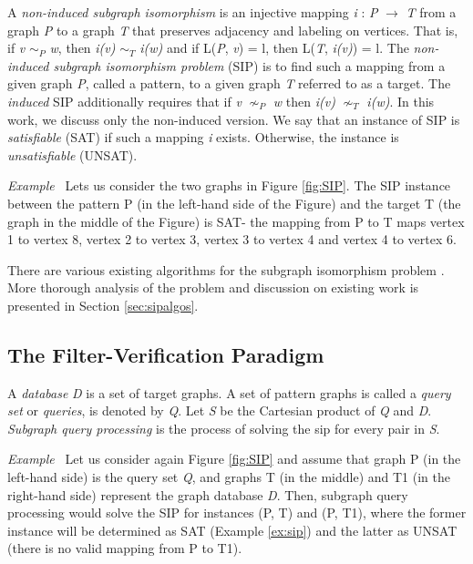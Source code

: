 \documentclass{l4proj}
\newcounter{example}[section]
\newenvironment{example}[1][]{\refstepcounter{example}\par\medskip
   \noindent \textit{Example~\theexample #1} \rmfamily}{\medskip}
\begin{document}
A \emph{non-induced subgraph isomorphism} is an injective mapping \emph{i} : \emph{P} $\rightarrow$ \emph{T} from a graph \emph{P} to a graph \emph{T} that preserves adjacency and labeling on vertices. That is, if \emph{v} $\sim_{P}$ \emph{w}, then \emph{i(v)} $\sim_{T}$ \emph{i(w)} and if L(\emph{P}, \emph{v}) = l, then L(\emph{T}, \emph{i(v)}) = l. The \emph{non-induced subgraph isomorphism problem} (SIP) is to find such a mapping from a given graph \emph{P}, called a pattern, to a given graph \emph{T} referred to as a target. The \emph{induced} SIP additionally requires that if \emph{v} $\nsim_{P}$ \emph{w} then \emph{i(v)} $\nsim_{T}$ \emph{i(w)}. In this work, we discuss only the non-induced version. We say that an instance of SIP is \emph{satisfiable} (SAT) if such a mapping \emph{i} exists. Otherwise, the instance is \emph{unsatisfiable} (UNSAT).

\begin{example}
\label{ex:sip}
Lets us consider the two graphs in Figure \ref{fig:SIP}. The SIP instance between the pattern P (in the left-hand side of the Figure) and the target T (the graph in the middle of the Figure) is SAT- the mapping from P to T maps vertex 1 to vertex 8, vertex 2 to vertex 3, vertex 3 to vertex 4 and vertex 4 to vertex 6.
\end{example}

There are various existing algorithms for the subgraph isomorphism problem \cite{vf2,Solnon:2010,CP2015,Larrosa:2002,Bonnici:2013,Zampelli:2010,nauty}. More thorough analysis of the problem and discussion on existing work is presented in Section \ref{sec:sipalgos}.

\subsection{The Filter-Verification Paradigm}
A \emph{database} \emph{D} is a set of target graphs. A set of pattern graphs is called a \emph{query set} or \emph{queries}, is denoted by \emph{Q}. Let \emph{S} be the Cartesian product of \emph{Q} and \emph{D}. \emph{Subgraph query processing} is the process of solving the \gls{sip} for every pair in \emph{S}.

\begin{example}
\label{ex:pathIndexing}
Let us consider again Figure \ref{fig:SIP} and assume that graph P (in the left-hand side) is the query set \emph{Q}, and graphs T (in the middle) and T1 (in the right-hand side) represent the graph database \emph{D}. Then, subgraph query processing would solve the SIP for instances (P, T) and (P, T1), where the former instance will be determined as SAT (Example \ref{ex:sip}) and the latter as UNSAT (there is no valid mapping from P to T1). 
\end{example}
\end{document}
